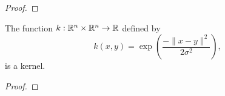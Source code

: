 \begin{theorem}
    \label{thm:constructing-kernels}
    \cite{rudin2020notes,shawe2004kernel}
    
\end{theorem}
\begin{proof}
    
\end{proof}

\begin{theorem}
    \label{thm:gaussian-kernel}
    The function \(k : \mathbb{R}^n \times \mathbb{R}^n \to \mathbb{R}\) defined by
    \begin{equation}
        \label{eqn:gaussian-kernel}
        k(x,y) = \exp\left(\frac{-\|x-y\|^2}{2\sigma^2}\right),
    \end{equation}
    is a kernel.
\end{theorem}

\begin{proof}
    
\end{proof}